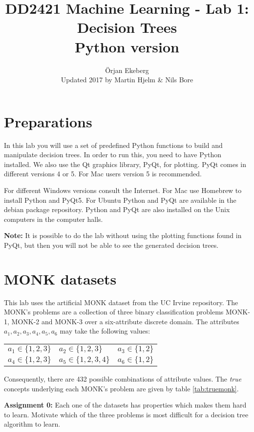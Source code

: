 \documentclass[11pt]{article}
\title{\vspace{-5.0cm}DD2421 Machine Learning - Lab 1: Decision Trees \\ Python version}
\author{\"Orjan Ekeberg\\ Updated 2017 by Martin Hjelm \& Nils Bore }
\begin{document}
\maketitle

\section{Preparations}

In this lab you will use a set of predefined Python functions to
build and manipulate decision trees.  In order to run this, you
need to have Python installed.  We also use the Qt graphics library,
PyQt, for plotting. PyQt comes in different versions 4 or 5. For
Mac users version 5 is recommended. 

For different Windows versions consult the Internet. For Mac use Homebrew 
to install Python and PyQt5. For Ubuntu Python and PyQt are available in the 
debian package repository. Python and PyQt are also installed on the Unix computers in 
the computer halls.

\textbf{Note:} It is possible to do the lab without using the
plotting functions found in PyQt, but then you will not be able to see the generated
decision trees.


\section{MONK datasets}

This lab uses the artificial MONK dataset from the UC Irvine repository.
The MONK's problems are a collection of three binary classification
problems MONK-1, MONK-2 and MONK-3 over a six-attribute discrete domain.
The attributes \(a_1, a_2, a_3, a_4, a_5, a_6\) may take the following values:

\begin{center}
  \begin{tabular}{lll}
    \(a_1 \in \{1, 2, 3\}\) &
    \(a_2 \in \{1, 2, 3\}\) &
    \(a_3 \in \{1, 2\}\)\\
    \(a_4 \in \{1, 2, 3\}\) &
    \(a_5 \in \{1, 2, 3, 4\}\) &
    \(a_6 \in \{1, 2\}\)\\
  \end{tabular}
\end{center}
Consequently, there are 432 possible combinations of attribute values. 
The \emph{true} concepts underlying each MONK's problem are given by
table \ref{tab:truemonk}.

\begin{tcolorbox}
\textbf{Assignment 0:}
Each one of the datasets has properties which makes them hard to learn.
Motivate which of the three problems is most difficult for a decision
tree algorithm to learn.
\end{tcolorbox}
\end{document}
